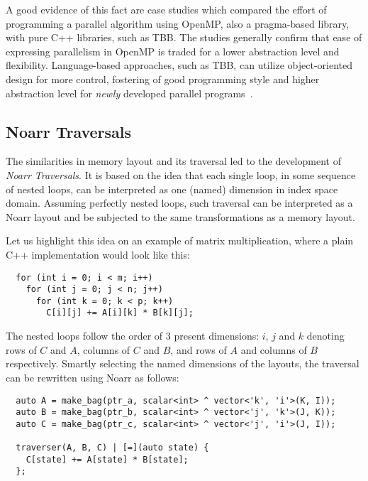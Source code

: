 A good evidence of this fact are case studies which compared the effort of programming a parallel algorithm using OpenMP, also a pragma-based library, with pure C++ libraries, such as TBB. The studies generally confirm that ease of expressing parallelism in OpenMP is traded for a lower abstraction level and flexibility. Language-based approaches, such as TBB, can utilize object-oriented design for more control, fostering of good programming style and higher abstraction level for \emph{newly} developed parallel programs~\cite{kegel2009using,ajkunic2012comparison,refsnes2011comparison}.

\subsection{Noarr Traversals}

The similarities in memory layout and its traversal led to the development of \emph{Noarr Traversals}. It is based on the idea that each single loop, in some sequence of nested loops, can be interpreted as one (named) dimension in index space domain. Assuming perfectly nested loops, such traversal can be interpreted as a Noarr layout and be subjected to the same transformations as a memory layout.

Let us highlight this idea on an example of matrix multiplication, where a plain C++ implementation would look like this:

\begin{verbatim}
  for (int i = 0; i < m; i++) 
    for (int j = 0; j < n; j++) 
      for (int k = 0; k < p; k++) 
        C[i][j] += A[i][k] * B[k][j];
\end{verbatim}
The nested loops follow the order of $3$ present dimensions: $i$, $j$ and $k$ denoting rows of $C$ and $A$, columns of $C$ and $B$, and rows of $A$ and columns of $B$ respectively. Smartly selecting the named dimensions of the layouts, the traversal can be rewritten using Noarr as follows:

\begin{verbatim}
  auto A = make_bag(ptr_a, scalar<int> ^ vector<'k', 'i'>(K, I));
  auto B = make_bag(ptr_b, scalar<int> ^ vector<'j', 'k'>(J, K));
  auto C = make_bag(ptr_c, scalar<int> ^ vector<'j', 'i'>(J, I));
  
  traverser(A, B, C) | [=](auto state) {
    C[state] += A[state] * B[state];
  };
\end{verbatim}

